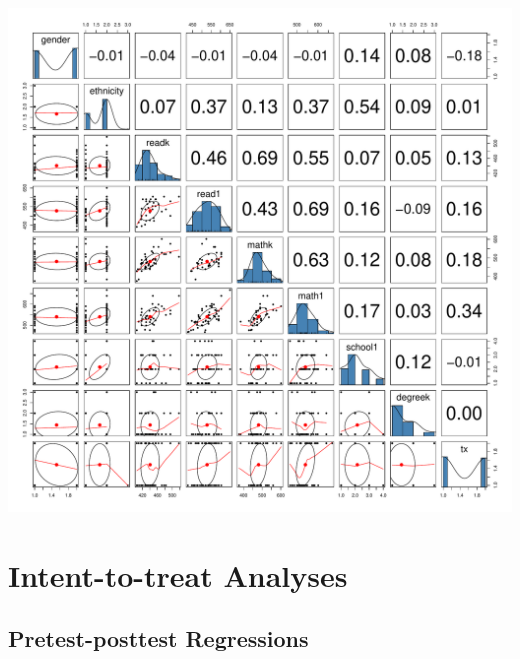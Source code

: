 \documentclass{article}\usepackage[]{graphicx}\usepackage[]{color}
\makeatletter
\def\maxwidth{ %
  \ifdim\Gin@nat@width>\linewidth
    \linewidth
  \else
    \Gin@nat@width
  \fi
}
\makeatother
\begin{document}
\includegraphics[width=\maxwidth]{figure/pairsplot} 


\clearpage
\section{Intent-to-treat Analyses}
\subsection{Pretest-posttest Regressions}
\end{document}
